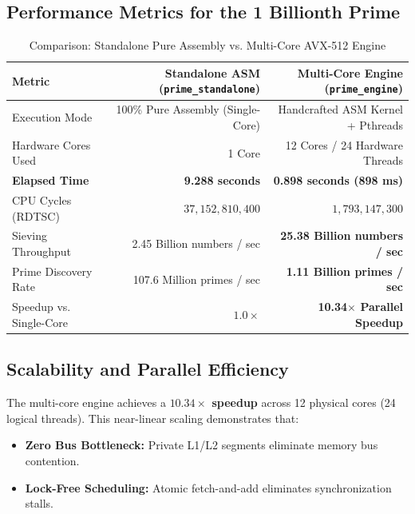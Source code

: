 \documentclass[11pt,a4paper]{article}
\begin{document}
\subsection{Performance Metrics for the 1 Billionth Prime}
\begin{table}[htbp]
\centering
\small
\caption{Comparison: Standalone Pure Assembly vs. Multi-Core AVX-512 Engine}
\begin{tabular}{lrr}
\toprule
\textbf{Metric} & \textbf{Standalone ASM (\texttt{prime\_standalone})} & \textbf{Multi-Core Engine (\texttt{prime\_engine})} \\
\midrule
Execution Mode & 100\% Pure Assembly (Single-Core) & Handcrafted ASM Kernel + Pthreads \\
Hardware Cores Used & 1 Core & 12 Cores / 24 Hardware Threads \\
\textbf{Elapsed Time} & \textbf{9.288 seconds} & \textbf{0.898 seconds (898 ms)} \\
CPU Cycles (RDTSC) & $37,152,810,400$ & $1,793,147,300$ \\
Sieving Throughput & 2.45 Billion numbers / sec & \textbf{25.38 Billion numbers / sec} \\
Prime Discovery Rate & 107.6 Million primes / sec & \textbf{1.11 Billion primes / sec} \\
Speedup vs. Single-Core & $1.0\times$ & \textbf{10.34$\times$ Parallel Speedup} \\
\bottomrule
\end{tabular}
\end{table}

\subsection{Scalability and Parallel Efficiency}
The multi-core engine achieves a \textbf{$10.34\times$ speedup} across 12 physical cores (24 logical threads). This near-linear scaling demonstrates that:
\begin{itemize}\setlength{\itemsep}{0pt}
    \item \textbf{Zero Bus Bottleneck:} Private L1/L2 segments eliminate memory bus contention.
    \item \textbf{Lock-Free Scheduling:} Atomic fetch-and-add eliminates synchronization stalls.
\end{itemize}

\newpage

\end{document}
